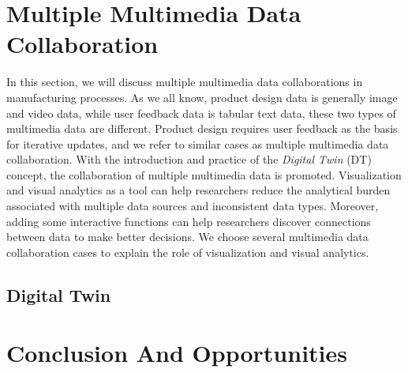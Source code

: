 \documentclass[a4paper,fleqn]{cas-dc}
\begin{document}
\section{Multiple Multimedia Data Collaboration}
In this section, we will discuss multiple multimedia data collaborations in manufacturing processes.
As we all know, product design data is generally image and video data, while user feedback data is tabular text data, these two types of multimedia data are different. Product design requires user feedback as the basis for iterative updates, and we refer to similar cases as multiple multimedia data collaboration.
With the introduction and practice of the \textit{Digital Twin} (DT) concept, the collaboration of multiple multimedia data is promoted.
Visualization and visual analytics as a tool can help researchers reduce the analytical burden associated with multiple data sources and inconsistent data types.
Moreover, adding some interactive functions can help researchers discover connections between data to make better decisions.
We choose several multimedia data collaboration cases to explain the role of visualization and visual analytics.

\subsection{Digital Twin}


\section{Conclusion And Opportunities}



\end{document}
